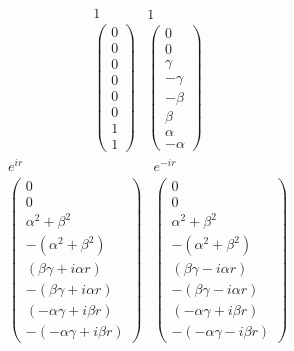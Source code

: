 \documentclass[12pt]{article}
\begin{document}
\begin{equation}
\begin{array}{c} 1 \\ \left( 
\begin{array}{c} 0 \\ 0 \\ 0 \\ 0 \\ 0 \\ 0 \\ 1 \\ 1 \end{array} \right) \end{array}
\begin{array}{c} 1 \\ \left( 
\begin{array}{c} 0 \\ 0 \\ \gamma \\ -\gamma \\
-\beta \\ \beta \\ \alpha \\ -\alpha \end{array} \right) \end{array}
\end{equation}
\begin{equation}
\begin{array}{c} e^{ir} \\ \left( 
\begin{array}{c} 0 \\ 0 \\ \alpha^2 + \beta^2 \\ -(\alpha^2 + \beta^2) \\
(\beta \gamma + i \alpha r) \\ -(\beta \gamma + i \alpha r) \\
(-\alpha \gamma + i \beta r) \\ -(-\alpha \gamma + i \beta r) \end{array} 
\right) \end{array}
\begin{array}{c} e^{-ir} \\ \left( 
\begin{array}{c} 0 \\ 0 \\ \alpha^2 + \beta^2 \\ -(\alpha^2 + \beta^2) \\
(\beta \gamma - i \alpha r) \\ -(\beta \gamma - i \alpha r) \\ 
(-\alpha \gamma + i \beta r) \\ -(-\alpha \gamma - i \beta r) \end{array} 
\right) \end{array}
\end{equation}
\end{document}
